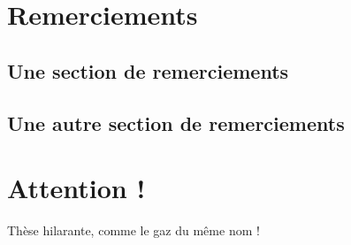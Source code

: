 \documentclass[12pt,space=onehalf]{yathesis}
\begin{document}
\makelaboratory
%
\dedication{Je dédie ce travail\\à tous ceux qui le méritent}
\dedication{À mon directeur bien-aimé !}
\dedication{À mon co-directeur bien-co-aimé !}
\makededications
%
\makefrontepigraphs
%
\chapter{Remerciements}
\section{Une section de remerciements}
\lipsum[1]
\section{Une autre section de remerciements}
\lipsum[2-9]
%
\chapter{Attention !}
Thèse hilarante, comme le gaz du même nom !
%
\begin{abstract}
  \lipsum[1-2]
\end{abstract}
\begin{abstract}
  \lipsum[3-4]
\end{abstract}
\makeabstract
%
\printacronyms
%
\printsymbols
%
\end{document}

